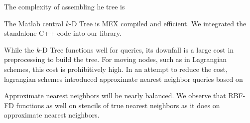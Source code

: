 \documentclass{report}
\begin{document}
{The complexity of assembling he tree is

The Matlab central $k$-D Tree is MEX compiled and efficient. We integrated the standalone C++ code into our library.  

While the $k$-D Tree functions well for queries, its downfall is a large cost in preprocessing to build the tree. For moving nodes, such as in Lagrangian schemes, this cost is prohibitively high. In an attempt to reduce the cost, lagrangian schemes introduced approximate nearest neighbor queries based on 

Approximate nearest neighbors will be nearly balanced. 
We observe that RBF-FD functions as well on stencils of true nearest neighbors as it does on approximate nearest neighbors. 

}

\ifstandalone


\end{document}
